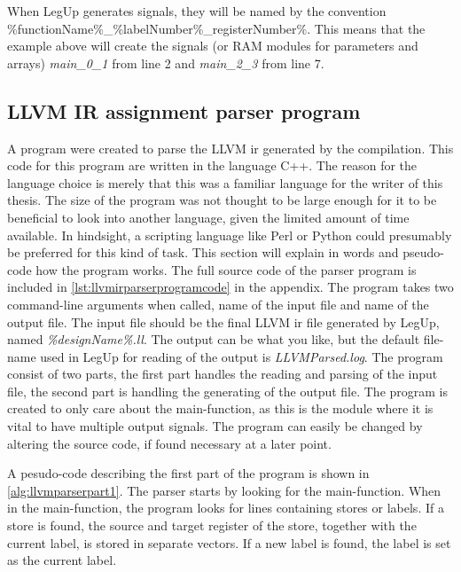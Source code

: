 When LegUp generates signals, they will be named by the convention \%functionName\%\_\%labelNumber\%\_registerNumber\%. This means that the example above will create the signals (or RAM modules for parameters and arrays) \textit{main\_0\_1} from line 2 and \textit{main\_2\_3} from line 7.
\subsection{\label{subsec:llvmirparserprogram}LLVM IR assignment parser program}
A program were created to parse the LLVM \gls{ir} generated by the compilation. This code for this program are written in the language C++. The reason for the language choice is merely that this was a familiar language for the writer of this thesis. The size of the program was not thought to be large enough for it to be beneficial to look into another language, given the limited amount of time available. In hindsight, a scripting language like Perl or Python could presumably be preferred for this kind of task. This section will explain in words and pseudo-code how the program works. The full source code of the parser program is included in \ref{lst:llvmirparserprogramcode} in the appendix. The program takes two command-line arguments when called, name of the input file and name of the output file. The input file should be the final LLVM \gls{ir} file generated by LegUp, named \textit{\%designName\%.ll}. The output can be what you like, but the default file-name used in LegUp for reading of the output is \textit{LLVMParsed.log}. The program consist of two parts, the first part handles the reading and parsing of the input file, the second part is handling the generating of the output file. The program is created to only care about the main-function, as this is the module where it is vital to have multiple output signals. The program can easily be changed by altering the source code, if found necessary at a later point.

A pesudo-code describing the first part of the program is shown in \cref{alg:llvmparserpart1}. The parser starts by looking for the main-function. When in the main-function, the program looks for lines containing stores or labels. If a store is found, the source and target register of the store, together with the current label, is stored in separate vectors. If a new label is found, the label is set as the current label.

